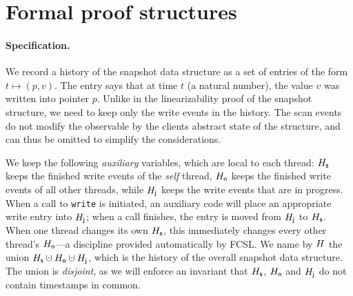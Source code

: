 \section{Formal proof structures}
\label{sc:formal}

\def\histx{\hist_\x}
\def\histy{\hist_\y}
\def\histp{\hist_p}
\def\ordlist{L}
\renewcommand{\tleq}{\mathrel{\leq_\ordlist}}
\renewcommand{\tle}{\mathrel{<_\ordlist}}
\renewcommand{\jleq}{\mathrel{\sqsubseteq_\ordlist}}
\newcommand{\E}{E}
\newcommand{\C}{C}
\newcommand{\sx}{S_\x}
\newcommand{\sy}{S_\y}
\newcommand{\spp}{S_p}
\newcommand{\wx}{W_\x}
\newcommand{\wy}{W_\y}
\newcommand{\wpp}{W_p}
\newcommand{\admissible}{\mathsf{fine}}

\paragraph{Specification.}
%
We record a history of the snapshot data structure as a set of entries
of the form $t \mapsto (p, v)$. The entry says that at time $t$ (a
natural number), the value $v$ was written into pointer $p$. Unlike in
the linearizability proof of the snapshot structure, we need to keep
only the write events in the history. The scan events do not modify
the observable by the clients abstract state of the structure, and can
thus be omitted to simplify the considerations.

We keep the following \emph{auxiliary} variables, which are local to
each thread: $H_{\mathsf{s}}$ keeps the finished write events of the
\emph{self} thread, $H_{\mathsf{o}}$ keeps the finished write events of all
other threads, while $H_{\mathsf{j}}$ keeps the write events that are in
progress. When a call to {\tt write} is initiated, an auxiliary code
will place an appropriate write entry into $H_{\mathsf{j}}$; when a call
finishes, the entry is moved from $H_{\mathsf{j}}$ to $H_{\mathsf{s}}$. When one
thread changes its own $H_{\mathsf{s}}$, this immediately changes every other
thread's $H_{\mathsf{o}}$---a discipline provided automatically by FCSL. We
name by $H$ the union $\histS \hunion \histO \hunion \histJ$,
which is the history of the overall snapshot data structure. The union
is \emph{disjoint}, as we will enforce an invariant that $H_{\mathsf{s}}$,
$H_{\mathsf{o}}$ and $H_{\mathsf{j}}$ do not contain timestamps in common.

